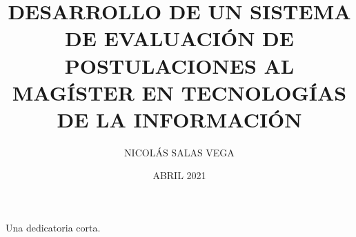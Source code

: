 \documentclass[upright, contnum]{umemoria}
\author{NICOLÁS SALAS VEGA}
\title{DESARROLLO DE UN SISTEMA DE EVALUACIÓN DE POSTULACIONES AL MAGÍSTER EN TECNOLOGÍAS DE LA INFORMACIÓN}
\date{ABRIL 2021}
\begin{document}
\frontmatter
\maketitle

\begin{abstract}
\lipsum[1-4]
\end{abstract}

\begin{dedicatoria}
Una dedicatoria corta.
\end{dedicatoria}

\begin{thanks}
\lipsum[1-2]
\end{thanks}

\cleardoublepage
\tableofcontents
\cleardoublepage
\listoftables
\cleardoublepage
\listoffigures

\mainmatter






\nocite{*}


\end{document}
